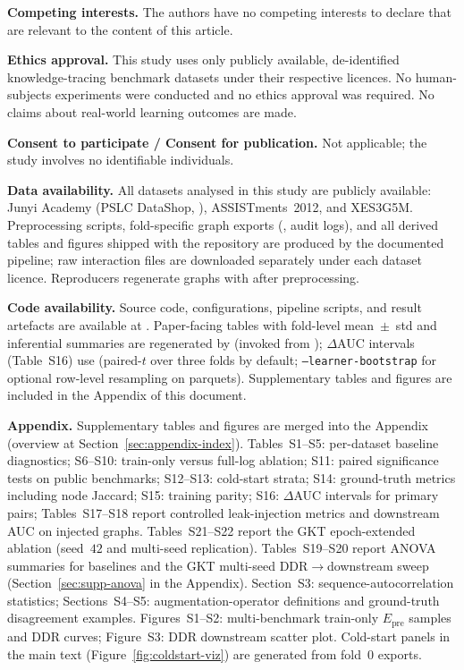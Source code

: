 \documentclass[pdflatex,sn-mathphys-num]{sn-jnl}
\newcommand{\Epre}{\ensuremath{E_{\text{pre}}}}
\newcommand{\DDR}{\textsc{DDR}}
\begin{document}
\medskip\noindent\textbf{Competing interests.} The authors have no competing
interests to declare that are relevant to the content of this article.

\medskip\noindent\textbf{Ethics approval.} This study uses only publicly
available, de-identified knowledge-tracing benchmark datasets under their
respective licences. No human-subjects experiments were conducted and no ethics
approval was required. No claims about real-world learning outcomes are made.

\medskip\noindent\textbf{Consent to participate / Consent for publication.} Not
applicable; the study involves no identifiable individuals.

\medskip\noindent\textbf{Data availability.} All datasets analysed in this study
are publicly available: Junyi Academy (PSLC DataShop,
),
ASSISTments~2012, and XES3G5M. Preprocessing scripts, fold-specific graph
exports (, audit logs), and all derived tables
and figures shipped with the repository are produced by the documented
pipeline; raw interaction files are downloaded separately under each
dataset licence. Reproducers regenerate graphs with
 after preprocessing.

\medskip\noindent\textbf{Code availability.} Source code, configurations, pipeline
scripts, and result artefacts are available at
. Paper-facing tables with
fold-level mean~$\pm$~std and inferential summaries are regenerated by
 (invoked from
); $\Delta$AUC intervals (Table~S16)
use  (paired-$t$ over three folds by default;
\texttt{--learner-bootstrap} for optional row-level resampling on parquets).
Supplementary tables and figures are included in the Appendix of this document.

\medskip\noindent\textbf{Appendix.} Supplementary tables and figures are merged into
the Appendix (overview at Section~\ref{sec:appendix-index}).
Tables~S1--S5: per-dataset baseline diagnostics; S6--S10: train-only versus
full-log ablation; S11: paired significance tests on public benchmarks;
S12--S13: cold-start strata; S14: ground-truth metrics including node Jaccard;
S15: training parity; S16: $\Delta$AUC intervals for primary pairs;
Tables~S17--S18 report controlled leak-injection metrics and downstream AUC
on injected graphs. Tables~S21--S22 report the GKT epoch-extended ablation
(seed~$42$ and multi-seed replication). Tables~S19--S20 report ANOVA summaries
for baselines and the GKT multi-seed \DDR{}$\to$downstream sweep
(Section~\ref{sec:supp-anova} in the Appendix).
Section~S3: sequence-autocorrelation statistics; Sections~S4--S5:
augmentation-operator definitions and ground-truth disagreement examples.
Figures~S1--S2: multi-benchmark train-only $\Epre$ samples and \DDR{} curves;
Figure~S3: \DDR{} downstream scatter plot. Cold-start panels in the main text (Figure~\ref{fig:coldstart-viz}) are generated from fold~0 exports.
\end{document}
